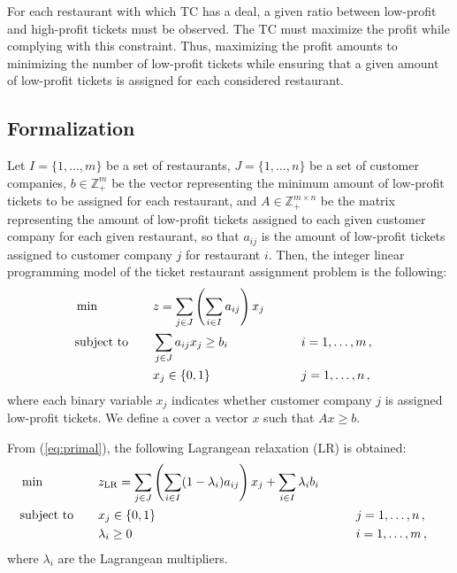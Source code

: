 \documentclass[runningheads]{llncs}
\begin{document}
For each restaurant with which TC has a deal, a given ratio between low-profit and high-profit tickets must be observed. 
The TC must maximize the profit while complying with this constraint. Thus, maximizing the profit amounts to minimizing the number of low-profit tickets while ensuring that a given amount of low-profit tickets is assigned for each considered restaurant.

\subsection{Formalization}
\label{subsec:problem:formalization}

Let $I = \{1,\dots,m\}$ be a set of restaurants, $J = \{1,\dots,n\}$ be a set of customer companies, $b \in \mathbb{Z}_{+}^{m}$ be the vector representing the minimum amount of low-profit tickets to be assigned for each restaurant, and $A \in \mathbb{Z}_{+}^{m \times n}$ be the matrix representing the amount of low-profit tickets assigned to each given customer company for each given restaurant, so that $a_{ij}$ is the amount of low-profit tickets assigned to customer company $j$ for restaurant $i$. Then, the integer linear programming model of the ticket restaurant assignment problem is the following:
\begin{alignat}{3}
  &\min & \quad & z = \sum_{j \in J} \left( \sum_{i \in I} a_{ij} \right) x_j \label{eq:primal}\\
  &\text{subject to}  &       & \sum_{j \in J} a_{ij} x_j \ge b_i & \qquad & i = 1,\dots,m \, , \notag\\
  &                   &       & x_j \in \{0,1\}  &\qquad& j = 1,\dots,n \, , \notag
\end{alignat}
where each binary variable $x_j$ indicates whether customer company $j$ is assigned low-profit tickets. We define a cover a vector $x$ such that $Ax \ge b$.

From (\ref{eq:primal}), the following Lagrangean relaxation (LR) is obtained:
\begin{alignat}{3}
  &\min & \quad & z_{\text{LR}} = \sum_{j \in J} \left( \sum_{i \in I} (1 - \lambda_i) a_{ij} \right) x_j + \sum_{i \in I} \lambda_i b_i \label{eq:lagrangean}\\
  &\text{subject to}  &       & x_j \in \{0,1\} & \qquad & j = 1,\dots,n \, , \notag\\
  &                   &       & \lambda_i \ge 0  & \qquad & i = 1,\dots,m \, , \notag
\end{alignat}
where $\lambda_i$ are the Lagrangean multipliers.
\end{document}
